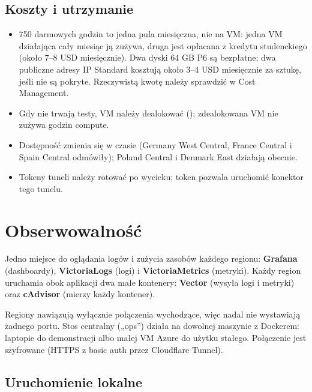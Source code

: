 \section{Koszty i utrzymanie}
\label{sec:op-koszty}

\begin{itemize}
  \item 750 darmowych godzin  to jedna pula miesięczna, nie na VM: jedna VM działająca cały miesiąc ją zużywa, druga jest opłacana z kredytu studenckiego (około 7--8 USD miesięcznie). Dwa dyski 64 GB P6 są bezpłatne; dwa publiczne adresy IP Standard kosztują około 3--4 USD miesięcznie za sztukę, jeśli nie są pokryte. Rzeczywistą kwotę należy sprawdzić w Cost Management.
  \item Gdy nie trwają testy, VM należy dealokować (); zdealokowana VM nie zużywa godzin compute.
  \item Dostępność  zmienia się w czasie (Germany West Central, France Central i Spain Central odmówiły); Poland Central i Denmark East działają obecnie.
  \item Tokeny tuneli należy rotować po wycieku; token pozwala uruchomić konektor tego tunelu.
\end{itemize}

\chapter{Obserwowalność}
\label{ch:op-obserwowalnosc}

Jedno miejsce do oglądania logów i zużycia zasobów każdego regionu:
\textbf{Grafana} (dashboardy), \textbf{VictoriaLogs} (logi) i \textbf{VictoriaMetrics}
(metryki). Każdy region uruchamia obok aplikacji dwa małe kontenery:
\textbf{Vector} (wysyła logi i metryki) oraz \textbf{cAdvisor} (mierzy każdy kontener).


Regiony nawiązują wyłącznie połączenia wychodzące, więc nadal nie wystawiają żadnego
portu. Stos centralny („ops'') działa na dowolnej maszynie z Dockerem: laptopie do
demonstracji albo małej VM Azure do użytku stałego. Połączenie jest szyfrowane
(HTTPS z basic auth przez Cloudflare Tunnel).

\section{Uruchomienie lokalne}

